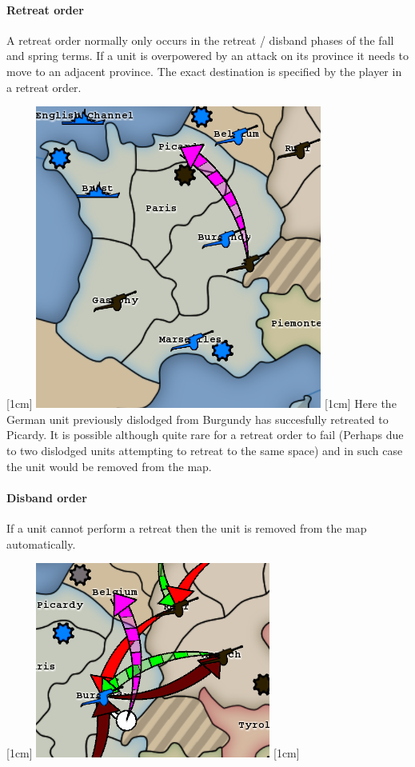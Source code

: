 \documentclass[pdftex,12pt,a4paper]{report}
\begin{document}
\paragraph{Retreat order}
A retreat order normally only occurs in the retreat / disband phases of the
fall and spring terms. If a unit is overpowered by an attack on its
province it needs to move to an adjacent province. The exact destination
is specified by the player in a retreat order.

[1cm]
\includegraphics{./screenshots/DefRetreat2.png}
[1cm]
Here the German unit previously dislodged from Burgundy has succesfully retreated to Picardy. 
It is possible although quite rare for a retreat order to fail (Perhaps due to two dislodged
units attempting to retreat to the same space) and in such case the unit would be removed from the map.

\paragraph{Disband order}
If a unit cannot perform a retreat then the unit is removed from the map automatically.

[1cm]
\includegraphics{./screenshots/ImmRetreat0.png}
[1cm]
\end{document}
